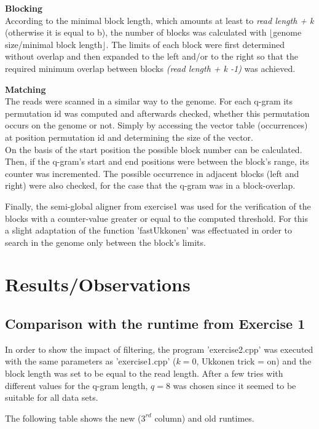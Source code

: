 \documentclass[11pt, notitlepage]{scrartcl}
\begin{document}
\textbf{Blocking}\\
According to the minimal block length, which amounts at least to \textit{read length + k} (otherwise it is equal to b), the number of blocks was calculated with $\lfloor$genome size/minimal block length$\rfloor$. The limits of each block were first determined without overlap and then expanded to the left and/or to the right so that the required minimum overlap between blocks \textit{(read length + k -1)} was achieved.

\textbf{Matching}\\
The reads were scanned in a similar way to the genome. For each q-gram its permutation id was computed and afterwards checked, whether this permutation occurs on the genome or not. Simply by accessing the vector table (occurrences) at position permutation id and determining the size of the vector.\\
On the basis of the start position the possible block number can be calculated. Then, if the q-gram's start and end
positions were between the block's range, its counter was incremented. The possible occurrence in adjacent blocks (left and right) were also checked, for the case that the q-gram was in a block-overlap.

Finally, the semi-global aligner from exercise1 was used for the verification of the blocks with a counter-value
greater or equal to the computed threshold. For this a slight adaptation of the function 'fastUkkonen' was
effectuated in order to search in the genome only between the block's limits.

\section{Results/Observations}
\subsection{Comparison with the runtime from Exercise 1}
In order to show the impact of filtering, the program 'exercise2.cpp' was executed with the same parameters as 'exercise1.cpp' ($k=0$, Ukkonen trick = on) and the block length was set to be equal to the read length. After a few tries with different values for the q-gram length, $q=8$ was chosen since it seemed to be suitable for all data sets.

The following table shows the new  ($3^{rd}$ column) and old runtimes.
\end{document}
